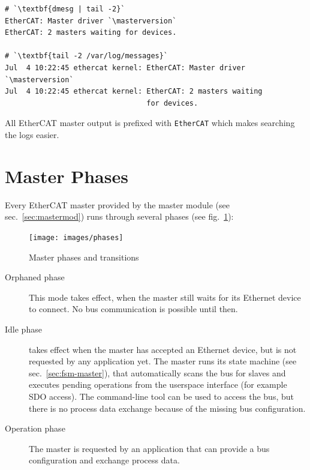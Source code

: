 \documentclass[a4paper,12pt,BCOR6mm,bibtotoc,idxtotoc]{scrbook}
\newcommand{\masterversion}{1.5.0}
\begin{document}
\begin{lstlisting}
# `\textbf{dmesg | tail -2}`
EtherCAT: Master driver `\masterversion`
EtherCAT: 2 masters waiting for devices.

# `\textbf{tail -2 /var/log/messages}`
Jul  4 10:22:45 ethercat kernel: EtherCAT: Master driver `\masterversion`
Jul  4 10:22:45 ethercat kernel: EtherCAT: 2 masters waiting
                                 for devices.
\end{lstlisting}

All EtherCAT master output is prefixed with \lstinline+EtherCAT+ which makes
searching the logs easier.


\section{Master Phases}

Every EtherCAT master provided by the master module (see
sec.~\ref{sec:mastermod}) runs through several phases (see
fig.~\ref{fig:phases}):

\begin{figure}[htbp]
  \centering
  \texttt{[image: images/phases]}
  \caption{Master phases and transitions}
  \label{fig:phases}
\end{figure}

\begin{description}

\item[Orphaned phase] This mode takes effect, when the
master still waits for its Ethernet device to connect. No bus communication is
possible until then.

\item[Idle phase] takes effect when the master has accepted
an Ethernet device, but is not requested by any application yet. The master
runs its state machine (see sec.~\ref{sec:fsm-master}), that automatically
scans the bus for slaves and executes pending operations from the userspace
interface (for example SDO access). The command-line tool can be used to
access the bus, but there is no process data exchange because of the missing
bus configuration.

\item[Operation phase] The master is requested by an
application that can provide a bus configuration and exchange process data.

\end{description}
\end{document}

